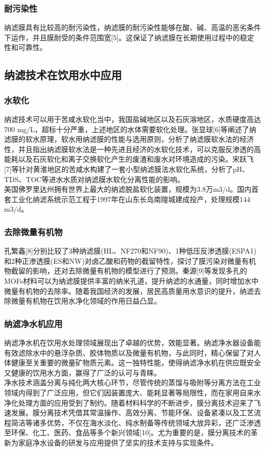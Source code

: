 \documentclass[a4paper,onecolumn,twoside]{article}
\begin{document}
\begin{multicols}{2}
    \subsubsection{耐污染性}
  纳滤膜具有比较高的耐污染性，纳滤膜的耐污染性能够在酸、碱、高温的恶劣条件下运作，并且膜耐受的条件范围宽[5]。这保证了纳滤膜在长期使用过程中的稳定性和可靠性。
  \subsection{纳滤技术在饮用水中应用}
    \subsubsection{水软化}
  纳滤技术可以用于苦咸水软化当中，我国盐碱地区以及石灰溶地区，水质硬度高达700 mg/L，超标十分严重，上述地区的水体需要软化处理。张显球[6]等阐述了纳滤膜的软水原理，软水用纳滤膜的性能与选用原则，分析了纳滤膜软水法的经济性，并且指出纳滤膜软水法是一种先进且经济的水软化技术，可以克服反渗透的高能耗以及石灰软化和离子交换软化产生的废渣和废水对环境造成的污染。宋跃飞[7]等针对黄淮地区的苦咸水构建了一套小型纳滤膜法水软化系统，分析了pH、TDS、TOC等进水水质对纳滤膜水软化分离性能的影响。\\
  美国佛罗里达州拥有世界上最大的纳滤脱盐软化装置，规模为3.8万m3/d。国内首套工业化纳滤系统示范工程于1997年在山东长岛南隍城建成投产，处理规模144 m3/d。
    \subsubsection{去除微量有机物}
    孔繁鑫[8]分别比较了3种纳滤膜(HL、NF270和NF90)、1种低压反渗透膜(ESPA1)和2种正渗透膜(ES和NW)对卤乙酸和药物的截留特性，探讨了膜污染对微量有机物截留的影响，还对去除微量有机物的模型进行了预测。秦源[9]等发现多孔的MOFs材料可以为纳滤膜提供丰富的纳米孔道，提升纳滤的水通量，同时增加水中微量有机物的去除率。随着我国经济的发展，居民高质量用水意识的提升，纳滤去除微量有机物在饮用水净化领域的作用日益凸显。
    \subsubsection{纳滤净水机应用}
  纳滤净水机在饮用水处理领域展现出了卓越的优势，效能显著。纳滤净水器设备能有效滤除水中的悬浮杂质、胶体物质以及微量有机物，与此同时，精心保留了对人体健康至关重要的微量矿物质元素。这一独特性能，使得纳滤净水机在供应既安全又健康的饮用水方面，赢得了广泛的认可与青睐。\\
  净水技术涵盖分离与纯化两大核心环节，尽管传统的蒸馏与吸附等分离方法在工业领域内得到了广泛应用，但它们因装置庞大、能耗显著等局限性，而在家用自来水净化处理方面的应用受到了制约。随着材料科学的不断进步，膜分离技术迎来了飞速发展。膜分离技术凭借其常温操作、高效分离、节能环保、设备紧凑以及工艺流程简洁等诸多优势，不仅在海水淡化、纯水制备等传统领域大放异彩，还广泛渗透至环保、化工、医药、食品等多个新兴领域[10]。尤为重要的是，膜分离技术的革新为家庭净水设备的研发与应用提供了坚实的技术支持与实现条件。
  

\end{multicols}
\end{document}
